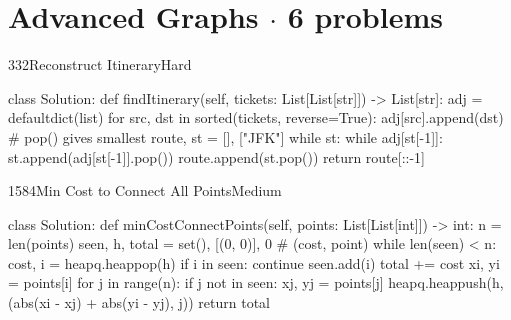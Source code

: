 \section{Advanced Graphs \texorpdfstring{{\normalsize\color{muted}$\cdot$ 6 problems}}{- 6 problems}}

\begin{problem}{332}{Reconstruct Itinerary}{Hard}
\begin{code}
class Solution:
    def findItinerary(self, tickets: List[List[str]]) -> List[str]:
        adj = defaultdict(list)
        for src, dst in sorted(tickets, reverse=True):
            adj[src].append(dst)            # pop() gives smallest
        route, st = [], ["JFK"]
        while st:
            while adj[st[-1]]:
                st.append(adj[st[-1]].pop())
            route.append(st.pop())
        return route[::-1]
\end{code}
\end{problem}

\begin{problem}{1584}{Min Cost to Connect All Points}{Medium}
\begin{code}
class Solution:
    def minCostConnectPoints(self, points: List[List[int]]) -> int:
        n = len(points)
        seen, h, total = set(), [(0, 0)], 0   # (cost, point)
        while len(seen) < n:
            cost, i = heapq.heappop(h)
            if i in seen:
                continue
            seen.add(i)
            total += cost
            xi, yi = points[i]
            for j in range(n):
                if j not in seen:
                    xj, yj = points[j]
                    heapq.heappush(h, (abs(xi - xj) + abs(yi - yj), j))
        return total
\end{code}
\end{problem}

